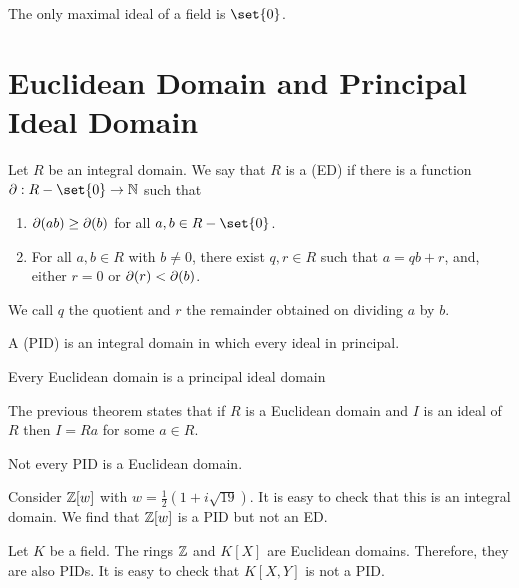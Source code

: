 \documentclass[11pt]{penrose}
\begin{document}
\begin{nlemma}
    The only maximal ideal of a field is $\set{0}$.
\end{nlemma}

\section{Euclidean Domain and Principal Ideal Domain}
\begin{ndfn}
    Let $R$ be an integral domain. We say that $R$ is a  (ED) if there is a function $\pd : R - \set{0} \to \N$ such that
    \begin{enumerate}
        \item $\partial(ab) \geq \partial(b)$ for all $a, b \in R - \set{0}$.
        \item For all $a, b \in R$ with $b \neq 0$, there exist $q, r \in R$ such that $a = qb + r$, and, either $r = 0$ or $\partial(r) < \partial(b)$.
    \end{enumerate}
    We call $q$ the quotient and $r$ the remainder obtained on dividing $a$ by $b$.
\end{ndfn}

\begin{ndfn}
    A  (PID) is an integral domain in which every ideal in principal.
\end{ndfn}

\begin{nthm}
    Every Euclidean domain is a principal ideal domain
\end{nthm}

\begin{remark}
    The previous theorem states that if $R$ is a Euclidean domain and $I$ is an ideal of $R$ then $I = Ra$ for some $a \in R$.
\end{remark}

\begin{negg}
    Not every PID is a Euclidean domain.

    Consider $\mathbb{Z}[w]$ with $w = \frac{1}{2}(1 + i\sqrt{19})$. It is easy to check that this is an integral domain. We find that $\mathbb{Z}[w]$ is a PID but not an ED.
\end{negg}

\begin{negg}
    Let $K$ be a field. The rings $\mathbb{Z}$ and $K[X]$ are Euclidean domains. Therefore, they are also PIDs. It is easy to check that $K[X,Y]$ is not a PID.
\end{negg}
\end{document}
